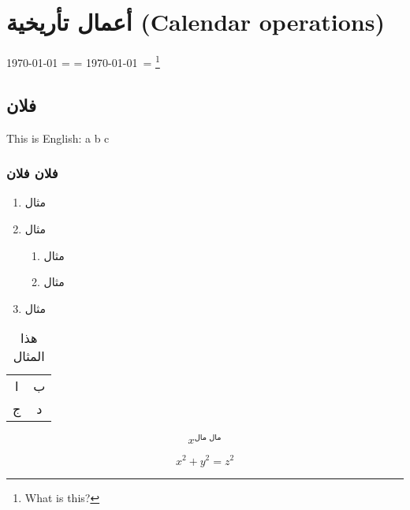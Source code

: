 \documentclass[a4paper]{book}%
\begin{document}
\section{أعمال تأريخية \textenglish{(Calendar operations)}}


\textenglish[variant=us]{\today} = \LR{\today} = \today\ = \Hijritoday%
\footnote{ What is this?}

\subsection{فلان}
\textenglish{This is English: a b c} %

\subsubsection{فلان فلان}
\begin{enumerate}
	\item مثال
	\item مثال
		\begin{enumerate}
			\item مثال
			\item مثال
		\end{enumerate}

	\item مثال	
\end{enumerate}

\begin{table}[h]
	\centering
	\begin{tabular}{cc}
		ا & ب  \\
		ج & د  
	\end{tabular}
	\caption{هذا المثال}
\end{table}

\[
x^\text{مال مال}
\]

\begin{equation}
	x^2 + y^2 = z^2
	\label{test}
\end{equation}
\end{document}
